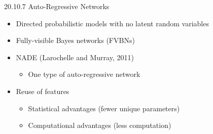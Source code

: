 \documentclass[dvipdfmx,presentation]{beamer}
\begin{document}
\begin{frame}[label={sec:orgheadline38}]{20.10.7 Auto-Regressive Networks}
\begin{itemize}
\item Directed probabilistic models with no latent random variables
\item Fully-visible Bayes networks (FVBNs)
\item NADE (Larochelle and Murray, 2011)
\begin{itemize}
\item One type of auto-regressive network
\end{itemize}
\item Reuse of features
\begin{itemize}
\item Statistical advantages (fewer unique parameters)
\item Computational advantages (less computation)
\end{itemize}
\end{itemize}
\end{frame}
\end{document}
